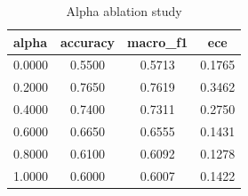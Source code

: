 \begin{table}[t]
\centering
\caption{Alpha ablation study}
\label{tab:table3_ablation_study}
\begin{tabular}{lccc}
\toprule
alpha & accuracy & macro\_f1 & ece \\
\midrule
0.0000 & 0.5500 & 0.5713 & 0.1765 \\
0.2000 & 0.7650 & 0.7619 & 0.3462 \\
0.4000 & 0.7400 & 0.7311 & 0.2750 \\
0.6000 & 0.6650 & 0.6555 & 0.1431 \\
0.8000 & 0.6100 & 0.6092 & 0.1278 \\
1.0000 & 0.6000 & 0.6007 & 0.1422 \\
\bottomrule
\end{tabular}
\end{table}
